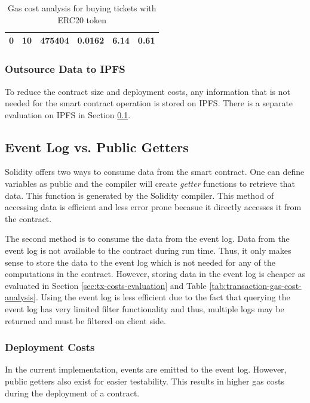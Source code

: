\begin{table}[ht]
\begin{tabular}{|c|c|c|c|c|c|}
{ 0}                                                                     & { 10}                                                                & { 475404}                                                       & { 0.0162}                                                        & { 6.14}                                                          & { 0.61}                                                                          \\ \hline
\end{tabular}
\caption{Gas cost analysis for buying tickets with ERC20 token}
\label{tab:gas-cost-buying-ticket-types-with-erc20}
\end{table}


\subsubsection{Outsource Data to IPFS}
To reduce the contract size and deployment costs, any information that is not needed for the smart contract operation is stored on IPFS. There is a separate evaluation on IPFS in Section \ref{subsection:event-log-vs-public-getters}.

\subsection{Event Log vs. Public Getters}\label{subsection:event-log-vs-public-getters}
Solidity offers two ways to consume data from the smart contract. One can define variables as public and the compiler will create \textit{getter} functions to retrieve that data. This function is generated by the Solidity compiler. This method of accessing data is efficient and less error prone becasue it directly accesses it from the contract. 

The second method is to consume the data from the event log. Data from the event log is not available to the contract during run time. Thus, it only makes sense to store the data to the event log which is not needed for any of the computations in the contract. However, storing data in the event log is cheaper as evaluated in Section \ref{sec:tx-costs-evaluation} and Table \ref{tab:transaction-gas-cost-analysis}. Using the event log is less efficient due to the fact that querying the event log has very limited filter functionality and thus, multiple logs may be returned and must be filtered on client side. 

\subsubsection{Deployment Costs}
In the current implementation, events are emitted to the event log. However, public getters also exist for easier testability. This results in higher gas costs during the deployment of a contract.

